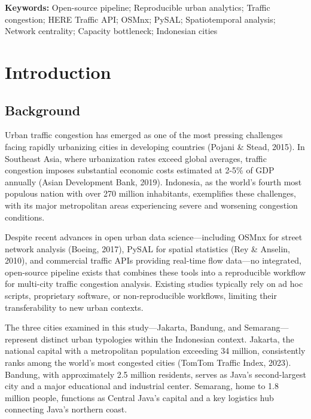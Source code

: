 \documentclass[12pt,a4paper]{article}
\begin{document}
\noindent\textbf{Keywords:} Open-source pipeline; Reproducible urban analytics; Traffic congestion; HERE Traffic API; OSMnx; PySAL; Spatiotemporal analysis; Network centrality; Capacity bottleneck; Indonesian cities

\newpage

\section{Introduction}

\subsection{Background}

Urban traffic congestion has emerged as one of the most pressing challenges facing rapidly urbanizing cities in developing countries (Pojani \& Stead, 2015). In Southeast Asia, where urbanization rates exceed global averages, traffic congestion imposes substantial economic costs estimated at 2-5\% of GDP annually (Asian Development Bank, 2019). Indonesia, as the world's fourth most populous nation with over 270 million inhabitants, exemplifies these challenges, with its major metropolitan areas experiencing severe and worsening congestion conditions.

Despite recent advances in open urban data science---including OSMnx for street network analysis (Boeing, 2017), PySAL for spatial statistics (Rey \& Anselin, 2010), and commercial traffic APIs providing real-time flow data---no integrated, open-source pipeline exists that combines these tools into a reproducible workflow for multi-city traffic congestion analysis. Existing studies typically rely on ad hoc scripts, proprietary software, or non-reproducible workflows, limiting their transferability to new urban contexts.

The three cities examined in this study---Jakarta, Bandung, and Semarang---represent distinct urban typologies within the Indonesian context. Jakarta, the national capital with a metropolitan population exceeding 34 million, consistently ranks among the world's most congested cities (TomTom Traffic Index, 2023). Bandung, with approximately 2.5 million residents, serves as Java's second-largest city and a major educational and industrial center. Semarang, home to 1.8 million people, functions as Central Java's capital and a key logistics hub connecting Java's northern coast.
\end{document}
